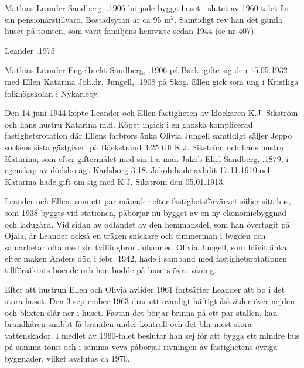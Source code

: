 {{{{%
%
Mathias Leander Sandberg, .1906 började bygga huset i slutet av 1960-talet för sin pensionärstillvaro. Bostadsytan är ca 95 m$^2$. Samtidigt rev han det gamla huset på tomten, som varit familjens hemviste sedan 1944 (se nr 407).

Leander .1975



%


%
Mathias Leander Engelbrekt Sandberg, .1906 på Back, gifte sig den 15.05.1932 med Ellen Katarina Joh.dr. Jungell, .1908 på Skog. Ellen gick som ung i Kristliga folkhögskolan i Nykarleby.

Den 14 juni 1944 köpte Leander och Ellen fastigheten av klockaren K.J. Sikström och hans hustru Katarina  m.fl. Köpet ingick i en ganska komplicerad fastighetsrotation där Ellens farbrors änka Olivia Jungell samtidigt säljer Jeppo sockens sista gästgiveri på Bäckstrand 3:25 till K.J. Sikström och hans hustru Katarina, som efter giftermålet med sin 1:a man Jakob Eliel Sandberg, .1879, i egenskap av dödsbo ägt Karlsborg 3:18. Jakob hade avlidit 17.11.1910 och Katarina hade gift om sig med K.J. Sikström den 05.01.1913.

Leander och Ellen, som ett par månader efter fastighetsförvärvet säljer sitt hus, som 1938 byggts vid stationen, påbörjar nu bygget av en ny ekonomiebyggnad och ladugård. Vid sidan av odlandet av den hemmansdel, som han övertagit på Ojala, är Leander också en trägen snickare och timmerman i bygden och samarbetar ofta med sin tvillingbror Johannes. Olivia Jungell, som blivit änka efter maken Anders död i febr. 1942, hade i samband med fastighetsrotationen tillförsäkrats boende och hon bodde på husets övre våning.

Efter att hustrun Ellen och Olivia avlider 1961 fortsätter Leander att bo i det stora huset. Den 3 september 1963 drar ett ovanligt häftigt åskväder över nejden och blixten slår ner i huset. Fastän det börjar brinna på ett par ställen, kan brandkåren snabbt få branden under kontroll och det blir mest stora vattenskador. I medlet av 1960-talet beslutar han sej för att bygga ett mindre hus på samma tomt och i samma veva påbörjas rivningen av fastighetens övriga byggnader, vilket avslutas ca 1970.
\begin{jhchildren}
  \item {}
  \item {}
\end{jhchildren}

}}}}
